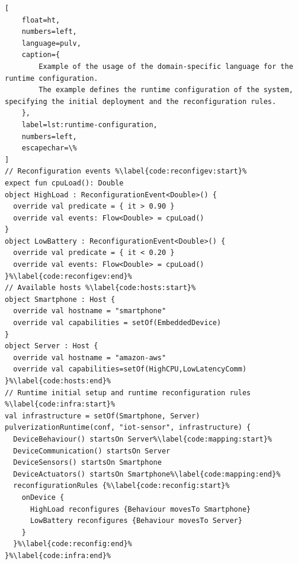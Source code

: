 \documentclass[conference]{IEEEtran}
\begin{document}
\begin{lstlisting}[
    float=ht,
    numbers=left,
    language=pulv,
    caption={
        Example of the usage of the domain-specific language for the runtime configuration.
        The example defines the runtime configuration of the system, specifying the initial deployment and the reconfiguration rules.
    },
    label=lst:runtime-configuration,
    numbers=left,
    escapechar=\%
]
// Reconfiguration events %\label{code:reconfigev:start}%
expect fun cpuLoad(): Double
object HighLoad : ReconfigurationEvent<Double>() {
  override val predicate = { it > 0.90 }
  override val events: Flow<Double> = cpuLoad()
}
object LowBattery : ReconfigurationEvent<Double>() {
  override val predicate = { it < 0.20 }
  override val events: Flow<Double> = cpuLoad()
}%\label{code:reconfigev:end}%
// Available hosts %\label{code:hosts:start}%
object Smartphone : Host {
  override val hostname = "smartphone"
  override val capabilities = setOf(EmbeddedDevice)
}
object Server : Host {
  override val hostname = "amazon-aws"
  override val capabilities=setOf(HighCPU,LowLatencyComm)
}%\label{code:hosts:end}%
// Runtime initial setup and runtime reconfiguration rules %\label{code:infra:start}%
val infrastructure = setOf(Smartphone, Server)
pulverizationRuntime(conf, "iot-sensor", infrastructure) {
  DeviceBehaviour() startsOn Server%\label{code:mapping:start}%
  DeviceCommunication() startsOn Server
  DeviceSensors() startsOn Smartphone
  DeviceActuators() startsOn Smartphone%\label{code:mapping:end}%
  reconfigurationRules {%\label{code:reconfig:start}%
    onDevice {
      HighLoad reconfigures {Behaviour movesTo Smartphone}
      LowBattery reconfigures {Behaviour movesTo Server}
    }
  }%\label{code:reconfig:end}%
}%\label{code:infra:end}%
\end{lstlisting}


% 
\end{document}
